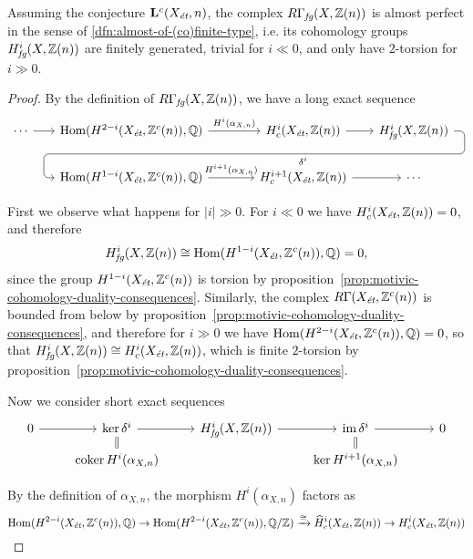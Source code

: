 \documentclass{article}
\numberwithin{equation}{section}
\begin{document}
\begin{proposition}
  \label{prop:RGammafg-almost-perfect}
  Assuming the conjecture $\mathbf{L}^c (X_\et, n)$,
  the complex $R\Gamma_\fg (X, \ZZ (n))$ is almost perfect in the
  sense of \ref{dfn:almost-of-(co)finite-type}, i.e. its cohomology groups
  $H^i_\fg (X, \ZZ (n))$ are finitely generated, trivial for $i \ll 0$, and only
  have $2$-torsion for $i \gg 0$.

  \begin{proof}
    By the definition of $R\Gamma_\fg (X, \ZZ (n))$, we have a long exact
    sequence
    \[ \begin{tikzcd}[column sep=1.75em]
      \cdots\ar{r} & \Hom (H^{2-i} (X_\et, \ZZ^c (n)), \QQ) \ar{r}{H^i (\alpha_{X,n})} &[2em] H^i_c (X_\et, \ZZ (n))\ar{r}\ar[draw=none]{d}[name=X, anchor=center]{} & H^i_\fg (X, \ZZ (n)) \ar[rounded corners,to path={ -- ([xshift=2ex]\tikztostart.east) |- (X.center) \tikztonodes -| ([xshift=-2ex]\tikztotarget.west) -- (\tikztotarget)}]{dll}[at end]{\delta^i} \\
      & \Hom (H^{1-i} (X_\et, \ZZ^c (n)), \QQ)\ar{r}{H^{i+1} (\alpha_{X,n})} & H^{i+1}_c (X_\et, \ZZ (n))\ar{r} & \cdots
    \end{tikzcd} \]

    First we observe what happens for $|i| \gg 0$.
    For $i \ll 0$ we have $H^i_c (X_\et, \ZZ (n)) = 0$, and therefore
    $$H^i_\fg (X, \ZZ (n)) \cong \Hom (H^{1-i} (X_\et, \ZZ^c (n)), \QQ) = 0,$$
    since the group $H^{1-i} (X_\et, \ZZ^c (n))$ is torsion by
    proposition~\ref{prop:motivic-cohomology-duality-consequences}.
    Similarly, the complex $R\Gamma (X_\et, \ZZ^c (n))$ is bounded from below by
    proposition~\ref{prop:motivic-cohomology-duality-consequences}, and therefore
    for $i \gg 0$ we have
    $\Hom (H^{2-i} (X_\et, \ZZ^c (n)), \QQ) = 0$, so that
    $H^i_\fg (X, \ZZ (n)) \cong H^i_c (X_\et, \ZZ (n))$, which is finite
    $2$-torsion by proposition~\ref{prop:motivic-cohomology-duality-consequences}.

    Now we consider short exact sequences
    \[ \begin{tikzcd}[row sep=0.5em]
      0 \ar{r} & \ker \delta^i \ar{r}\ar[equals]{d} & H^i_\fg (X, \ZZ (n)) \ar{r} & \im \delta^i \ar{r}\ar[equals]{d} & 0\\
      & \coker H^i (\alpha_{X,n}) & & \ker H^{i+1} (\alpha_{X,n})
    \end{tikzcd} \]

    By the definition of $\alpha_{X,n}$, the morphism $H^i (\alpha_{X,n})$ factors as
    \[ \Hom (H^{2-i} (X_\et, \ZZ^c (n)), \QQ) \to
    \Hom (H^{2-i} (X_\et, \ZZ^c (n)), \QQ/\ZZ) \xrightarrow{\cong}
    \widehat{H}^i_c (X_\et, \ZZ (n)) \to H^i_c (X_\et, \ZZ (n)) \]


\end{proof}
\end{proposition}
\end{document}
